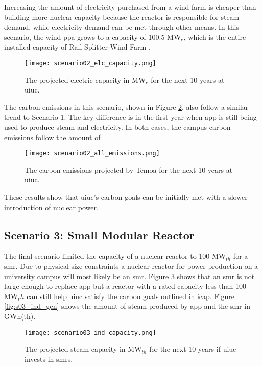 Increasing the amount of electricity purchased
from a wind farm is cheaper than building more nuclear capacity because the
reactor is responsible for steam demand, while electricity demand can be met
through other means. In this scenario, the wind \gls{ppa} grows to a capacity of
100.5 MW$_e$, which is the entire installed capacity of Rail Splitter Wind Farm
\cite{breitweiser_wind_2016}.

\begin{figure}[ht!]
	\centering
	\texttt{[image: scenario02\_elc\_capacity.png]}
	\caption{The projected electric capacity in MW$_{e}$ for the next 10 years at
	\gls{uiuc}.}
	\label{fig:s02_elc_cap}
\end{figure}

The carbon emissions in this scenario, shown in Figure \ref{fig:s02_all_co2},
also follow a similar trend to Scenario 1. The key difference is in the first
year when \gls{app} is still being used to produce steam and electricity. In
both cases, the campus carbon emissions follow the amount of

\begin{figure}[ht!]
	\centering
	\texttt{[image: scenario02\_all\_emissions.png]}
	\caption{The carbon emissions projected by Temoa for the next 10 years at
	\gls{uiuc}.}
	\label{fig:s02_all_co2}
\end{figure}
These results show that \gls{uiuc}'s carbon goals can be initially met with a
slower introduction of nuclear power.


\subsection{Scenario 3: Small Modular Reactor}
The final scenario limited the capacity of a nuclear reactor to 100  MW$_{th}$
for a \gls{smr}. Due to physical size constraints a nuclear reactor
for power production on a university campus will most likely be an \gls{smr}.
Figure \ref{fig:s03_ind_cap} shows that an \gls{smr} is not large enough
to replace \gls{app} but a reactor with a rated capacity less than 100 MW$_th$
can still help \gls{uiuc} satisfy the carbon goals outlined in \gls{icap}.
Figure \ref{fig:s03_ind_gen} shows the amount of steam produced by \gls{app} and
the \gls{smr} in GWh(th).

\begin{figure}[ht!]
	\centering
	\texttt{[image: scenario03\_ind\_capacity.png]}
	\caption{The projected steam capacity in MW$_{th}$ for the next 10 years if
	\gls{uiuc} invests in \glspl{smr}.}
	\label{fig:s03_ind_cap}
\end{figure}

